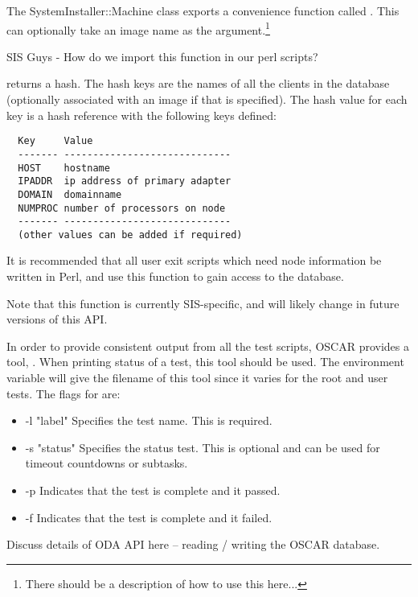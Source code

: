 The SystemInstaller::Machine class exports a convenience function
called .  This can optionally take an image
name as the argument.\footnote{There should be a description of how to
  use this here...}

\begin{discuss}
SIS Guys - How do we import this function in our perl scripts?
\end{discuss}

 returns a hash.  The hash keys are the
names of all the clients in the database (optionally associated with
an image if that is specified).  The hash value for each key is a hash
reference with the following keys defined:

\begin{verbatim}
  Key     Value
  ------- -----------------------------
  HOST    hostname
  IPADDR  ip address of primary adapter
  DOMAIN  domainname
  NUMPROC number of processors on node
  ------- -----------------------------
  (other values can be added if required)
\end{verbatim}

It is recommended that all user exit scripts which need node
information be written in Perl, and use this function to gain access
to the database.

Note that this function is currently SIS-specific, and will likely
change in future versions of this API.


In order to provide consistent output from all the test scripts, OSCAR
provides a tool, . When printing status of a test, this tool
should be used. The environment variable  will
give the filename of this tool since it varies for the root and user 
tests. The flags for  are:
\begin{itemize}
\item -l "label"  Specifies the test name. This is required.
\item -s "status" Specifies the status test. This is optional and can be 
                  used for timeout countdowns or subtasks.
\item -p          Indicates that the test is complete and it passed.
\item -f          Indicates that the test is complete and it failed.
\end{itemize}

\begin{discuss}
  Discuss details of ODA API here -- reading / writing the OSCAR
  database.
\end{discuss}

